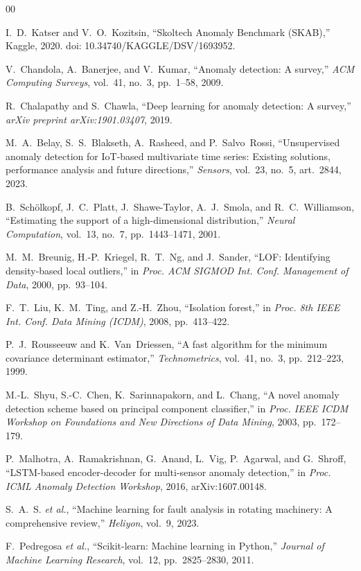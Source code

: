 \documentclass[conference]{IEEEtran}
\begin{document}
\begin{thebibliography}{00}

I.~D.~Katser and V.~O.~Kozitsin, ``Skoltech Anomaly Benchmark (SKAB),''
Kaggle, 2020. doi: 10.34740/KAGGLE/DSV/1693952.

V.~Chandola, A.~Banerjee, and V.~Kumar, ``Anomaly detection: A survey,''
\emph{ACM Computing Surveys}, vol.~41, no.~3, pp.~1--58, 2009.

R.~Chalapathy and S.~Chawla, ``Deep learning for anomaly detection: A survey,''
\emph{arXiv preprint arXiv:1901.03407}, 2019.

M.~A.~Belay, S.~S.~Blakseth, A.~Rasheed, and P.~Salvo~Rossi, ``Unsupervised
anomaly detection for IoT-based multivariate time series: Existing solutions,
performance analysis and future directions,'' \emph{Sensors}, vol.~23, no.~5,
art.~2844, 2023.

B.~Sch\"olkopf, J.~C.~Platt, J.~Shawe-Taylor, A.~J.~Smola, and
R.~C.~Williamson, ``Estimating the support of a high-dimensional
distribution,'' \emph{Neural Computation}, vol.~13, no.~7, pp.~1443--1471, 2001.

M.~M.~Breunig, H.-P.~Kriegel, R.~T.~Ng, and J.~Sander, ``LOF: Identifying
density-based local outliers,'' in \emph{Proc. ACM SIGMOD Int. Conf. Management
of Data}, 2000, pp.~93--104.

F.~T.~Liu, K.~M.~Ting, and Z.-H.~Zhou, ``Isolation forest,'' in \emph{Proc. 8th
IEEE Int. Conf. Data Mining (ICDM)}, 2008, pp.~413--422.

P.~J.~Rousseeuw and K.~Van~Driessen, ``A fast algorithm for the minimum
covariance determinant estimator,'' \emph{Technometrics}, vol.~41, no.~3,
pp.~212--223, 1999.

M.-L.~Shyu, S.-C.~Chen, K.~Sarinnapakorn, and L.~Chang, ``A novel anomaly
detection scheme based on principal component classifier,'' in \emph{Proc. IEEE
ICDM Workshop on Foundations and New Directions of Data Mining}, 2003,
pp.~172--179.

P.~Malhotra, A.~Ramakrishnan, G.~Anand, L.~Vig, P.~Agarwal, and G.~Shroff,
``LSTM-based encoder-decoder for multi-sensor anomaly detection,'' in
\emph{Proc. ICML Anomaly Detection Workshop}, 2016, arXiv:1607.00148.

S.~A.~S. \emph{et al.}, ``Machine learning for fault analysis in rotating
machinery: A comprehensive review,'' \emph{Heliyon}, vol.~9, 2023.

F.~Pedregosa \emph{et al.}, ``Scikit-learn: Machine learning in Python,''
\emph{Journal of Machine Learning Research}, vol.~12, pp.~2825--2830, 2011.

\end{thebibliography}
\end{document}
